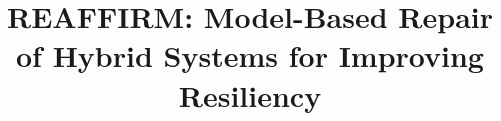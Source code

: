 \documentclass[sigconf]{acmart}
\begin{document}






%
\title{REAFFIRM: Model-Based Repair of Hybrid Systems for Improving Resiliency}

\end{document}
